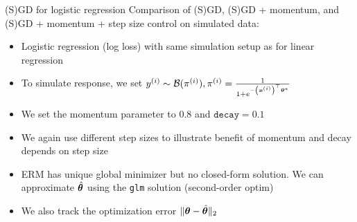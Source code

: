 \documentclass[11pt,compress,t,notes=noshow, xcolor=table]{beamer}
\begin{document}
\begin{vbframe}{(S)GD for logistic regression}
Comparison of (S)GD, (S)GD + momentum, and (S)GD + momentum + step size control on simulated data:

\begin{itemize}\setlength{\itemsep}{1.1em}
    \item Logistic regression (log loss) with same simulation setup as for linear regression
    \item To simulate response, we set $y^{(i)} \sim \mathcal{B}(\pi^{(i)}), \pi^{(i)} = \frac{1}{1+e^{-\left(\bm{x}^{(i)}\right)^{\top}\bm{\theta}^{\ast}}}$
    \item We set the momentum parameter to $0.8$ and $\texttt{decay}=0.1$
    \item We again use different step sizes to illustrate benefit of momentum and decay depends on step size
    \item ERM has unique global minimizer but no closed-form solution. We can approximate $\hat{\bm{\theta}}$ using the \texttt{glm} solution (second-order optim)
    \item We also track the optimization error $\Vert \bm{\theta} - \hat{\bm{\theta}} \Vert_2$
\end{itemize}

\end{vbframe}

\end{document}
